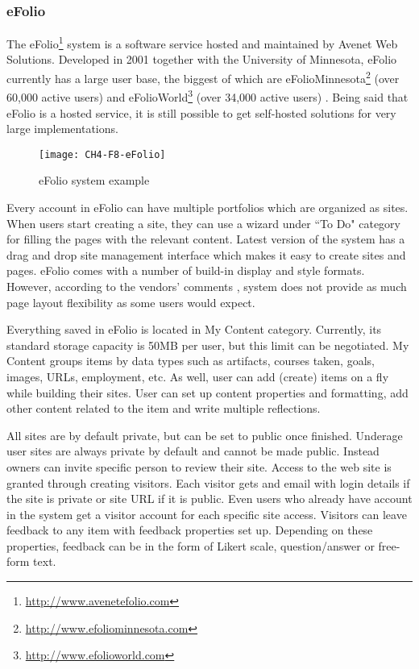 \subsubsection{eFolio}

The eFolio\footnote{\url{http://www.avenetefolio.com}} system is a software
service hosted and maintained by Avenet Web Solutions. Developed in 2001
together with the University of Minnesota, eFolio currently has a large user
base, the biggest of which are
eFolioMinnesota\footnote{\url{http://www.efoliominnesota.com}} (over 60,000
active users) and eFolioWorld\footnote{\url{http://www.efolioworld.com}} (over
34,000 active users) \citep{AAEEBL2011}. Being said that eFolio is a hosted
service, it is still possible to get self-hosted solutions for very large
implementations.

\begin{figure}[htb]
\centering
\setlength\fboxsep{0pt}
\setlength\fboxrule{0.5pt}
\texttt{[image: CH4-F8-eFolio]}
\caption[eFolio system example]{eFolio system example \citep{EFolioMinnesota2011}}
\label{fig:efolio}
\end{figure}

Every account in eFolio can have multiple portfolios which are organized as
sites. When users start creating a site, they can use a wizard under ``To Do"
category for filling the pages with the relevant content. Latest version of
the system has a drag and drop site management interface which makes it easy to
create sites and pages. eFolio comes with a number of build-in display and style
formats. However, according to the vendors' comments \citep{AAEEBL2011}, system
does not provide as much page layout flexibility as some users would expect.

Everything saved in eFolio is located in My Content category. Currently, its
standard storage capacity is 50MB per user, but this limit can be negotiated. My
Content groups items by data types such as artifacts, courses taken, goals, images,
URLs, employment, etc. As well, user can add (create) items on a fly while
building their sites. User can set up content properties and formatting, add
other content related to the item and write multiple reflections.

All sites are by default private, but can be set to public once finished.
Underage user sites are always private by default and cannot be made public.
Instead owners can invite specific person to review their site. Access to the
web site is granted through creating visitors. Each visitor gets and
email with login details if the site is private or site URL if it is
public. Even users who already have account in the system get a visitor
account for each specific site access. Visitors can leave feedback to any item
with feedback properties set up. Depending on these properties, feedback can be
in the form of Likert scale, question/answer or free-form text.


